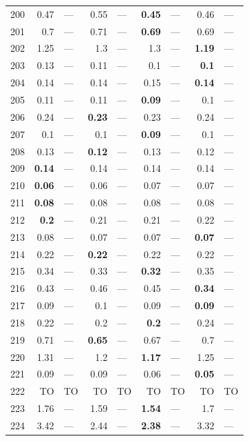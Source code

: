 \begin{longtable}{lr@{\hskip 4pt}l@{\hskip 12pt}r@{\hskip 4pt}l@{\hskip 12pt}r@{\hskip 4pt}l@{\hskip 12pt}r@{\hskip 4pt}l@{\hskip 12pt}}
200 & 0.47 & --- & 0.55 & --- & \textbf{0.45} & --- & 0.46 & --- \\
201 & 0.7 & --- & 0.71 & --- & \textbf{0.69} & --- & 0.69 & --- \\
202 & 1.25 & --- & 1.3 & --- & 1.3 & --- & \textbf{1.19} & --- \\
203 & 0.13 & --- & 0.11 & --- & 0.1 & --- & \textbf{0.1} & --- \\
204 & 0.14 & --- & 0.14 & --- & 0.15 & --- & \textbf{0.14} & --- \\
205 & 0.11 & --- & 0.11 & --- & \textbf{0.09} & --- & 0.1 & --- \\
206 & 0.24 & --- & \textbf{0.23} & --- & 0.23 & --- & 0.24 & --- \\
207 & 0.1 & --- & 0.1 & --- & \textbf{0.09} & --- & 0.1 & --- \\
208 & 0.13 & --- & \textbf{0.12} & --- & 0.13 & --- & 0.12 & --- \\
209 & \textbf{0.14} & --- & 0.14 & --- & 0.14 & --- & 0.14 & --- \\
210 & \textbf{0.06} & --- & 0.06 & --- & 0.07 & --- & 0.07 & --- \\
211 & \textbf{0.08} & --- & 0.08 & --- & 0.08 & --- & 0.08 & --- \\
212 & \textbf{0.2} & --- & 0.21 & --- & 0.21 & --- & 0.22 & --- \\
213 & 0.08 & --- & 0.07 & --- & 0.07 & --- & \textbf{0.07} & --- \\
214 & 0.22 & --- & \textbf{0.22} & --- & 0.22 & --- & 0.22 & --- \\
215 & 0.34 & --- & 0.33 & --- & \textbf{0.32} & --- & 0.35 & --- \\
216 & 0.43 & --- & 0.46 & --- & 0.45 & --- & \textbf{0.34} & --- \\
217 & 0.09 & --- & 0.1 & --- & 0.09 & --- & \textbf{0.09} & --- \\
218 & 0.22 & --- & 0.2 & --- & \textbf{0.2} & --- & 0.24 & --- \\
219 & 0.71 & --- & \textbf{0.65} & --- & 0.67 & --- & 0.7 & --- \\
220 & 1.31 & --- & 1.2 & --- & \textbf{1.17} & --- & 1.25 & --- \\
221 & 0.09 & --- & 0.09 & --- & 0.06 & --- & \textbf{0.05} & --- \\
222 & TO & TO & TO & TO & TO & TO & TO & TO \\
223 & 1.76 & --- & 1.59 & --- & \textbf{1.54} & --- & 1.7 & --- \\
224 & 3.42 & --- & 2.44 & --- & \textbf{2.38} & --- & 3.32 & --- \\

\end{longtable}

